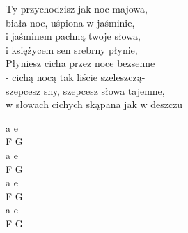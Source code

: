 
\begin{minipage}{\dimexpr.4\textwidth-.4\columnsep}
    \noindent Ty przychodzisz jak noc majowa,\\
    biała noc, uśpiona w jaśminie,\\
    i jaśminem pachną twoje słowa,\\
    i księżycem sen srebrny płynie,\\
    \hfill\break
    Płyniesz cicha przez noce bezsenne\\
    - cichą nocą tak liście szeleszczą-\\
    szepcesz sny, szepcesz słowa tajemne,\\
    w słowach cichych skąpana jak w deszczu\\
\end{minipage}
\hfill
\begin{minipage}{\dimexpr.05\textwidth-.05\columnsep}
    \ifchorded
    \noindent a e\\
    F G\\
    a e\\
    F G\\
    \hfill\break
    a e\\
    F G\\
    a e\\
    F G\\
    \else
    \fi
\end{minipage}
